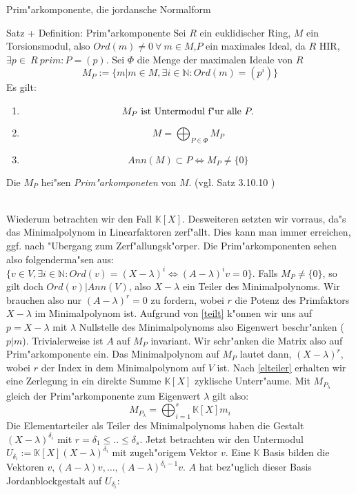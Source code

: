 \documentclass[a4paper]{article}
\begin{document}
\begin{section}{Prim"arkomponente, die jordansche Normalform}
\begin{subsection}{Satz + Definition: Prim"arkomponente}
Sei $R$ ein euklidischer Ring, $M$ ein Torsionsmodul, also $Ord(m) \not= 0\ \forall  \ m\in M$,$P$ ein maximales Ideal, da $R$ HIR, $\exists p \in \ R \ prim: P=(p)$.
Sei $\Phi$ die Menge der maximalen Ideale von $R$
$$M_P := \{ m | m \in M, \exists i \in \mathbb{N}: Ord(m) = (p^i)\}$$
Es gilt:
\begin{enumerate}
\item $$M_P \textnormal{ ist Untermodul f"ur alle } P.$$
\item $$M = \bigoplus_{P \in \Phi} M_P$$
\item $$Ann(M) \subset P \Longleftrightarrow M_P \not= \{0\}$$ \label{teilt}
\end{enumerate}
Die $M_P$ hei"sen \emph{Prim"arkomponeten} von $M$. (vgl. Satz 3.10.10 \cite{vorlesung})\\\\
\end{subsection}
Wiederum betrachten wir den Fall $\mathbb{K}[X]$. Desweiteren setzten wir vorraus, da"s das Minimalpolynom in Linearfaktoren zerf"allt. Dies kann man immer erreichen, ggf. nach "Ubergang zum Zerf"allungsk"orper. Die Prim"arkomponenten sehen also folgenderma"sen aus: $\{ v \in V, \exists i \in \mathbb{N}: Ord(v) = (X-\lambda)^i \Leftrightarrow (A-\lambda)^i v = 0 \}$. Falls $M_P \not= \{0\}$, so gilt doch $Ord(v) | Ann(V)$, also $X-\lambda$ ein Teiler des Minimalpolynoms. Wir brauchen also nur $(A-\lambda)^r = 0 $ zu fordern, wobei $r$ die Potenz des Primfaktors $X-\lambda$ im Minimalpolynom ist. Aufgrund von \ref{teilt} k"onnen wir uns auf $p=X-\lambda$ mit $\lambda$ Nullstelle des Minimalpolynoms also Eigenwert beschr"anken ($p | m$). Trivialerweise ist $A$ auf $M_P$ invariant. Wir schr"anken die Matrix also auf Prim"arkomponente ein. Das Minimalpolynom auf $M_P$ lautet dann, $(X-\lambda)^r$, wobei $r$ der Index in dem Minimalpolynom auf $V$ ist. Nach \ref{elteiler} erhalten wir eine Zerlegung in ein direkte Summe $\mathbb{K}[X]$ zyklische Unterr"aume. Mit $M_{P_\lambda}$ gleich der Prim"arkomponente zum Eigenwert $\lambda$ gilt also:
\begin{equation} M_{P_\lambda} = \bigoplus_{i=1}^s \mathbb{K}[X] m_i \label{sum} \end{equation}
Die Elementarteiler als Teiler des Minimalpolynoms haben die Gestalt $(X-\lambda)^{\delta_i}$ mit $r=\delta_1 \leq .. \leq \delta_s$. Jetzt betrachten wir den Untermodul $U_{\delta_i}:=\mathbb{K}[X] (X-\lambda)^{\delta_i}$ mit zugeh"origem Vektor $v$. Eine $\mathbb{K}$ Basis bilden die Vektoren $v, (A-\lambda) v, \ldots, (A-\lambda)^{\delta_i-1} v$. $A$ hat bez"uglich dieser Basis Jordanblockgestalt auf $U_{\delta_i}$:

\end{section}
\end{document}
